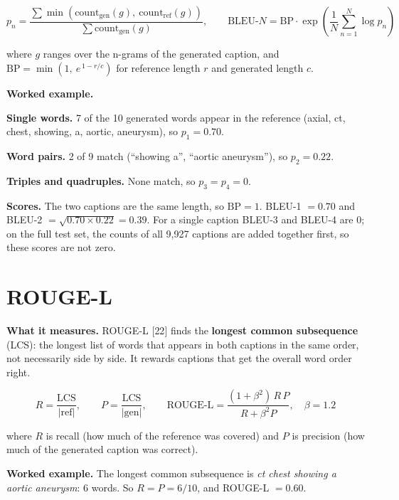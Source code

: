 \[p_n = \frac{\sum \min\left(\text{count}_{\text{gen}}(g),\ \text{count}_{\text{ref}}(g)\right)}{\sum \text{count}_{\text{gen}}(g)}, \qquad \text{BLEU-}N = \text{BP} \cdot \exp\left(\frac{1}{N}\sum_{n=1}^{N} \log p_n\right) \tag{5.1}\]

where \(g\) ranges over the n-grams of the generated caption, and \(\text{BP} = \min\left(1,\allowbreak\ e^{\,1 - r/c}\right)\) for reference length \(r\) and generated length \(c\).

\begin{examplebox}

\textbf{Worked example.}

\textbf{Single words.} 7 of the 10 generated words appear in the reference (axial, ct, chest, showing, a, aortic, aneurysm), so \(p_1 = 0.70\).

\textbf{Word pairs.} 2 of 9 match (``showing a'', ``aortic aneurysm''), so \(p_2 = 0.22\).

\textbf{Triples and quadruples.} None match, so \(p_3 = p_4 = 0\).

\textbf{Scores.} The two captions are the same length, so \(\text{BP} = 1\). BLEU-1 \(= 0.70\) and BLEU-2 \(= \sqrt{0.70 \times 0.22} = 0.39\). For a single caption BLEU-3 and BLEU-4 are 0; on the full test set, the counts of all 9,927 captions are added together first, so these scores are not zero.

\end{examplebox}

\section{ROUGE-L}

\textbf{What it measures.} ROUGE-L {[}22{]} finds the \textbf{longest common subsequence} (LCS): the longest list of words that appears in both captions in the same order, not necessarily side by side. It rewards captions that get the overall word order right.

\[R = \frac{\text{LCS}}{|\text{ref}|}, \qquad P = \frac{\text{LCS}}{|\text{gen}|}, \qquad \text{ROUGE-L} = \frac{(1 + \beta^2)\, R\, P}{R + \beta^2 P}, \quad \beta = 1.2 \tag{5.2}\]

where \(R\) is recall (how much of the reference was covered) and \(P\) is precision (how much of the generated caption was correct).

\begin{examplebox}

\textbf{Worked example.} The longest common subsequence is \emph{ct chest showing a aortic aneurysm}: 6 words. So \(R = P = 6/10\), and ROUGE-L \(= 0.60\).

\end{examplebox}

